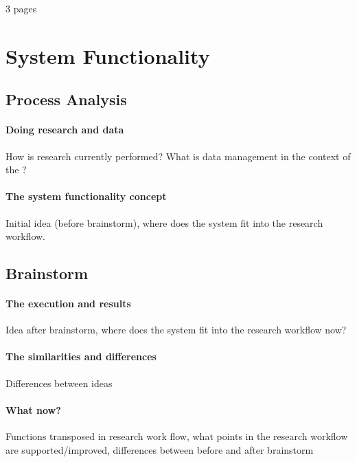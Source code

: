 3 pages

\section{System Functionality}
\subsection{Process Analysis}
\paragraph{Doing research and \project{} data}
How is research currently performed?
What is data management in the context of the \ivfsystem{}?
\paragraph{The system functionality concept}
Initial idea (before brainstorm), where does the system fit into the research workflow.

\subsection{Brainstorm}
\paragraph{The execution and results}
Idea after brainstorm, where does the system fit into the research workflow now?
\paragraph{The similarities and differences}
Differences between ideas
\paragraph{What now?}
Functions transposed in research work flow, what points in the research workflow are supported/improved, differences between before and after brainstorm